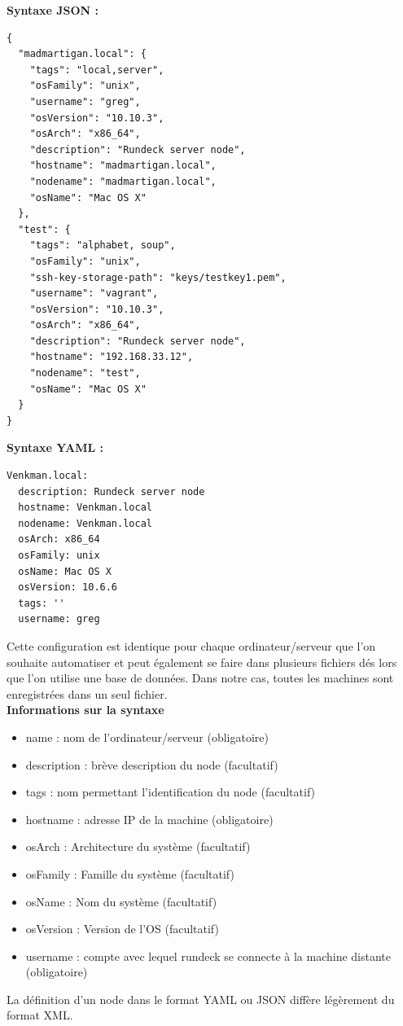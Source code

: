 \documentclass[12pt]{article}
\begin{document}
\vspace{0.5cm}
\textbf{Syntaxe JSON :}
\\

\begin{lstlisting}
{
  "madmartigan.local": {
    "tags": "local,server",
    "osFamily": "unix",
    "username": "greg",
    "osVersion": "10.10.3",
    "osArch": "x86_64",
    "description": "Rundeck server node",
    "hostname": "madmartigan.local",
    "nodename": "madmartigan.local",
    "osName": "Mac OS X"
  },
  "test": {
    "tags": "alphabet, soup",
    "osFamily": "unix",
    "ssh-key-storage-path": "keys/testkey1.pem",
    "username": "vagrant",
    "osVersion": "10.10.3",
    "osArch": "x86_64",
    "description": "Rundeck server node",
    "hostname": "192.168.33.12",
    "nodename": "test",
    "osName": "Mac OS X"
  }
}
\end{lstlisting}

\vspace{0.5cm}
\textbf{Syntaxe YAML :}
\\

\begin{lstlisting}
Venkman.local:
  description: Rundeck server node
  hostname: Venkman.local
  nodename: Venkman.local
  osArch: x86_64
  osFamily: unix
  osName: Mac OS X
  osVersion: 10.6.6
  tags: ''
  username: greg
\end{lstlisting}

\vspace{0.5cm}
Cette configuration est identique pour chaque ordinateur/serveur que l'on souhaite automatiser et peut également se faire dans plusieurs fichiers dés lors que l'on utilise une base de données. Dans notre cas, toutes les machines sont enregistrées dans un seul fichier.
\vspace{0.5cm}
\\
\textbf{Informations sur la syntaxe}
\begin{itemize}
    \item name : nom de l'ordinateur/serveur (obligatoire)
    \item description : brève description du node (facultatif)
    \item tags : nom permettant l'identification du node (facultatif)
    \item hostname : adresse IP de la machine (obligatoire)
    \item osArch : Architecture du système (facultatif)
    \item osFamily : Famille du système (facultatif)
    \item osName : Nom du système (facultatif)
    \item osVersion : Version de l'OS (facultatif)
    \item username : compte avec lequel rundeck se connecte à la machine distante (obligatoire)
\end{itemize}
\vspace{0.5cm}
La définition d'un node dans le format YAML ou JSON diffère légèrement du format XML.
\end{document}

